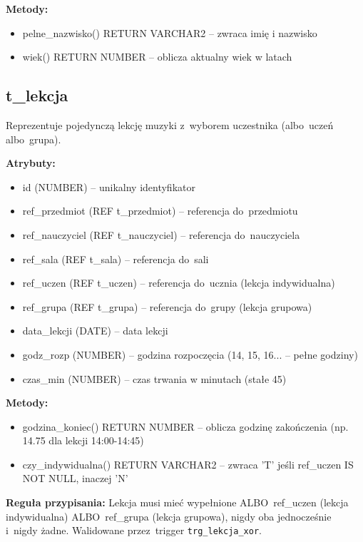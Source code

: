 \documentclass[12pt,a4paper]{article}
\begin{document}
\textbf{Metody:}
\begin{itemize}[nosep]
    \item pelne\_nazwisko() RETURN VARCHAR2 -- zwraca imię i nazwisko
    \item wiek() RETURN NUMBER -- oblicza aktualny wiek w latach
\end{itemize}

\subsection{t\_lekcja}

Reprezentuje pojedynczą lekcję muzyki z~wyborem uczestnika (albo~uczeń albo~grupa).

\textbf{Atrybuty:}
\begin{itemize}[nosep]
    \item id (NUMBER) -- unikalny identyfikator
    \item ref\_przedmiot (REF t\_przedmiot) -- referencja do~przedmiotu
    \item ref\_nauczyciel (REF t\_nauczyciel) -- referencja do~nauczyciela
    \item ref\_sala (REF t\_sala) -- referencja do~sali
    \item ref\_uczen (REF t\_uczen) -- referencja do~ucznia (lekcja indywidualna)
    \item ref\_grupa (REF t\_grupa) -- referencja do~grupy (lekcja grupowa)
    \item data\_lekcji (DATE) -- data lekcji
    \item godz\_rozp (NUMBER) -- godzina rozpoczęcia (14, 15, 16... -- pełne godziny)
    \item czas\_min (NUMBER) -- czas trwania w minutach (stałe 45)
\end{itemize}

\textbf{Metody:}
\begin{itemize}[nosep]
    \item godzina\_koniec() RETURN NUMBER -- oblicza godzinę zakończenia (np. 14.75 dla lekcji 14:00-14:45)
    \item czy\_indywidualna() RETURN VARCHAR2 -- zwraca 'T' jeśli ref\_uczen IS NOT NULL, inaczej 'N'
\end{itemize}

\textbf{Reguła przypisania:} Lekcja musi mieć wypełnione ALBO~ref\_uczen (lekcja indywidualna) ALBO~ref\_grupa (lekcja grupowa), nigdy oba jednocześnie i~nigdy żadne. Walidowane przez~trigger \texttt{trg\_lekcja\_xor}.
\end{document}
